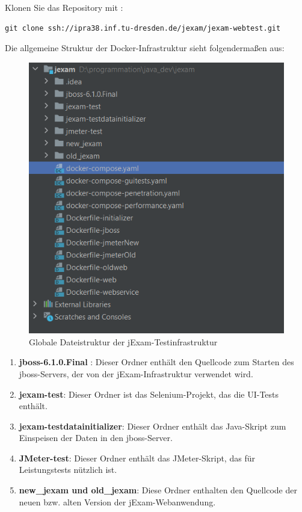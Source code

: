 Klonen Sie das Repository mit :
\begin{lstlisting}[caption={Clone repository},label={lst:clone repo}]
git clone ssh://ipra38.inf.tu-dresden.de/jexam/jexam-webtest.git
\end{lstlisting}

Die allgemeine Struktur der Docker-Infrastruktur
sieht folgendermaßen aus:

\begin{figure}[H]
    \centering
    \includegraphics[scale=1]{images/docker-files}
    \caption{Globale Dateistruktur der jExam-Testinfrastruktur} \label{fig:global}
\end{figure}

\begin{enumerate}

    \item \textbf{jboss-6.1.0.Final} : Dieser Ordner
    enthält den Quellcode zum Starten des jboss-Servers, der von der jExam-Infrastruktur verwendet wird.

    \item \textbf{jexam-test}: Dieser Ordner ist das
    Selenium-Projekt, das die UI-Tests enthält.

    \item \textbf{jexam-testdatainitializer}: Dieser
    Ordner enthält das Java-Skript zum Einspeisen der
    Daten in den jboss-Server.

    \item \textbf{JMeter-test}: Dieser Ordner enthält
    das JMeter-Skript, das für Leistungstests nützlich
    ist.

    \item \textbf{new\_jexam und old\_jexam}: Diese
    Ordner enthalten den Quellcode der neuen bzw.
    alten Version der jExam-Webanwendung.

\end{enumerate}

